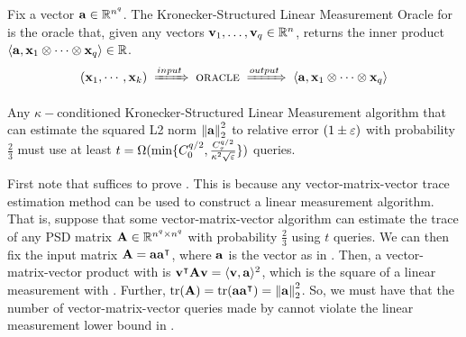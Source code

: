 \begin{definition}
    Fix a vector \(\boldsymbol{\mathrm{a}} \in {\mathbb R}^{n^q}\).
    The Kronecker-Structured Linear Measurement Oracle for \va is the oracle that, given any vectors \(\boldsymbol{\mathrm{v}}_1,\ldots,\boldsymbol{\mathrm{v}}_q \in {\mathbb R}^n\), returns the inner product \(\langle \boldsymbol{\mathrm{a}}, \boldsymbol{\mathrm{x}}_1 \otimes \cdots \otimes \boldsymbol{\mathrm{x}}_q\rangle \in {\mathbb R}\).
    \[
        (\boldsymbol{\mathrm{x}}_1, \cdots, \boldsymbol{\mathrm{x}}_k)
		\hspace{0.1cm} \xRightarrow{input} \hspace{0.1cm}
		\textsc{oracle}
		\hspace{0.1cm} \xRightarrow{output} \hspace{0.1cm}
		\langle \boldsymbol{\mathrm{a}}, \boldsymbol{\mathrm{x}}_1 \otimes \cdots \otimes \boldsymbol{\mathrm{x}}_q \rangle
    \]
\end{definition}
\begin{theorem}
    \label{thm:l2-estimation-lower-bound}
    Any \(\kappa-\)conditioned Kronecker-Structured Linear Measurement algorithm that can estimate the squared L2 norm \(\norm{\va}_2^2\) to relative error \((1\pm\varepsilon)\) with probability \(\frac23\) must use at least \(t = \Omega(\min\{C_0^{q/2}, \frac{C_\tau^{q/2}}{\kappa^2 \sqrt{\varepsilon}}\})\) queries.
\end{theorem}

First note that  suffices to prove .
This is because any vector-matrix-vector trace estimation method can be used to construct a linear measurement algorithm.
That is, suppose that some vector-matrix-vector algorithm can estimate the trace of any PSD matrix \(\mathbf{A}\in{\mathbb R}^{n^q \times n^q}\) with probability \(\frac23\) using \(t\) queries.
We can then fix the input matrix \(\mathbf{A} = \boldsymbol{\mathrm{a}}\boldsymbol{\mathrm{a}}^\intercal\), where \(\boldsymbol{\mathrm{a}}\) is the vector as in .
Then, a vector-matrix-vector product with \mA is \(\boldsymbol{\mathrm{v}}^\intercal\mathbf{A}\boldsymbol{\mathrm{v}} = \langle \boldsymbol{\mathrm{v}}, \boldsymbol{\mathrm{a}}\rangle^2\), which is the square of a linear measurement with \va.
Further, \(\tr(\mA) = \tr(\va\va^\intercal) = \norm{\va}_2^2\).
So, we must have that the number of vector-matrix-vector queries made by \mA cannot violate the linear measurement lower bound in .

